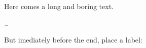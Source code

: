 \documentclass{article}
\begin{document}
Here comes a long and boring text.

\ldots

But imediately before the end, place a label:

\label{LASTPAGE}
\end{document}
